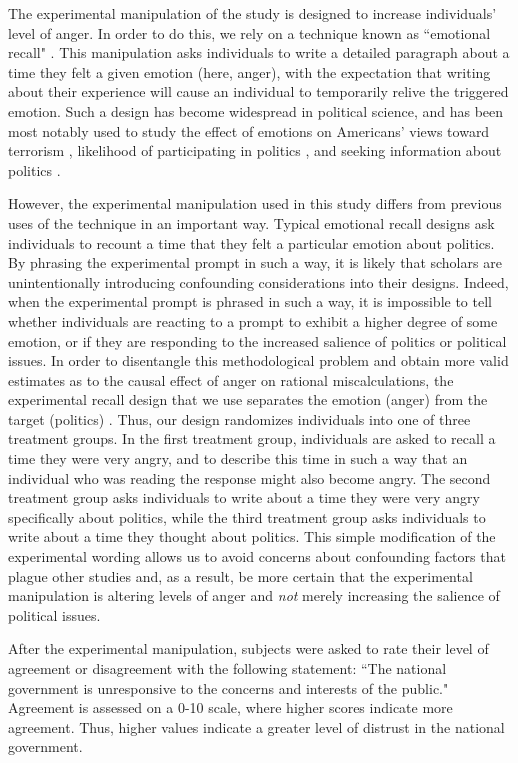 \documentclass[12pt, letterpaper]{article}
\begin{document}
The experimental manipulation of the study is designed to increase individuals' level of anger. In order to do this, we rely on a technique known as ``emotional recall" \citep{lerneretal2003effects, lerner_kelter2001}. This manipulation asks individuals to write a detailed paragraph about a time they felt a given emotion (here, anger), with the expectation that writing about their experience will cause an individual to temporarily relive the triggered emotion. Such a design has become widespread in political science, and has been most notably used to study the effect of emotions on Americans' views toward terrorism \citep{lerneretal2003effects}, likelihood of participating in politics \citep{vbggh}, and seeking information about politics \citep{valentinoetal2008}.

However, the experimental manipulation used in this study differs from previous uses of the technique in an important way. Typical emotional recall designs ask individuals to recount a time that they felt a particular emotion about politics. By phrasing the experimental prompt in such a way, it is likely that scholars are unintentionally introducing confounding considerations into their designs. Indeed, when the experimental prompt is phrased in such a way, it is impossible to tell whether individuals are reacting to a prompt to exhibit a higher degree of some emotion, or if they are responding to the increased salience of politics or political issues. In order to disentangle this methodological problem and obtain more valid estimates as to the causal effect of anger on rational miscalculations, the experimental recall design that we use separates the emotion (anger) from the target (politics) \citep[see also,][]{webster2017}. Thus, our design randomizes individuals into one of three treatment groups. In the first treatment group, individuals are asked to recall a time they were very angry, and to describe this time in such a way that an individual who was reading the response might also become angry. The second treatment group asks individuals to write about a time they were very angry specifically about politics, while the third treatment group asks individuals to write about a time they thought about politics. This simple modification of the experimental wording allows us to avoid concerns about confounding factors that plague other studies and, as a result, be more certain that the experimental manipulation is altering levels of anger and \emph{not} merely increasing the salience of political issues.

After the experimental manipulation, subjects were asked to rate their level of agreement or disagreement with the following statement: ``The national government is unresponsive to the concerns and interests of the public." Agreement is assessed on a 0-10 scale, where higher scores indicate more agreement. Thus, higher values indicate a greater level of distrust in the national government.
\end{document}
